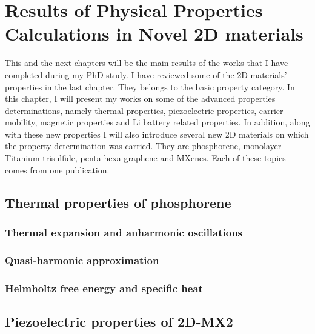 
\chapter{Results of Physical Properties Calculations in Novel 2D materials \label{chap:4}}

\ifpdf
    \graphicspath{{Chapter4/Figs/Raster/}{Chapter4/Figs/PDF/}{Chapter4/Figs/}}
\else
    \graphicspath{{Chapter4/Figs/Vector/}{Chapter4/Figs/}}
\fi

This and the next chapters will be the main results of the works that I have completed during my PhD study. I have reviewed some of the 2D materials' properties in the last chapter. They belongs to the basic property category. In this chapter, I will present my works on some of the advanced properties determinations, namely thermal properties, piezoelectric properties, carrier mobility, magnetic properties and Li battery related properties. In addition, along with these new properties I will also introduce several new 2D materials on which the property determination was carried. They are phosphorene, monolayer Titanium trisulfide, penta-hexa-graphene and MXenes. Each of these topics comes from one publication. 

\section{Thermal properties of phosphorene}
\subsection{Thermal expansion and anharmonic oscillations}
\subsection{Quasi-harmonic approximation}
\subsection{Helmholtz free energy and specific heat}

\section{Piezoelectric properties of 2D-MX2}
